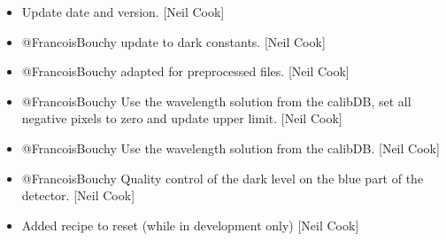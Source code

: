 \documentclass[a4paper,10pt,english]{report}
\begin{document}
\begin{itemize}
\item {} 
Update date and version. {[}Neil Cook{]}

\item {} 
@FrancoisBouchy \sphinxhyphen{} update to dark constants. {[}Neil Cook{]}

\item {} 
@FrancoisBouchy \sphinxhyphen{}  adapted for preprocessed files.
{[}Neil Cook{]}

\item {} 
@FrancoisBouchy \sphinxhyphen{} Use the wavelength solution from the calibDB, set
all negative pixels to zero and update  upper limit.
{[}Neil Cook{]}

\item {} 
@FrancoisBouchy \sphinxhyphen{} Use the wavelength solution from the calibDB. {[}Neil
Cook{]}

\item {} 
@FrancoisBouchy \sphinxhyphen{} Quality control of the dark level on the blue part
of the detector. {[}Neil Cook{]}

\item {} 
Added recipe to reset (while in development only) {[}Neil Cook{]}

\end{itemize}
\end{document}
